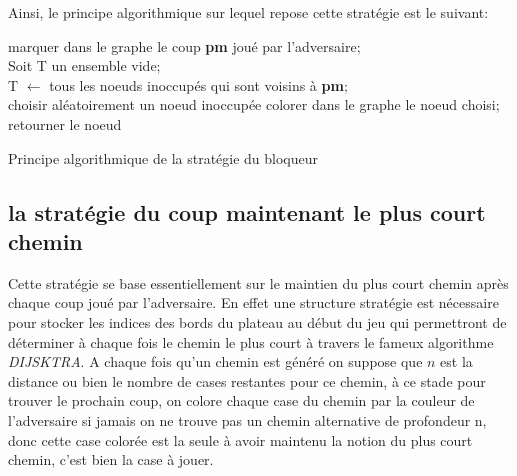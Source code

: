 Ainsi, le principe algorithmique sur lequel repose cette stratégie est le suivant:
\begin{algorithm}[H]

marquer dans le graphe le coup \textbf{pm} joué par l'adversaire;\\   
Soit T un ensemble vide;\\
T $\leftarrow$ tous les noeuds inoccupés qui sont voisins à \textbf{pm};\\
    {
    choisir aléatoirement un noeud inoccupée}
colorer dans le graphe le noeud choisi;\\
retourner le noeud

\caption{Principe algorithmique de la stratégie du bloqueur}
\label{algoBi}
\end{algorithm}

\subsection{la stratégie du coup maintenant le plus court chemin}
Cette stratégie se base essentiellement sur le maintien du plus court chemin après chaque coup joué par l'adversaire. En effet une structure stratégie est nécessaire pour stocker les indices des bords du plateau au début du jeu qui permettront de déterminer à chaque fois le chemin le plus court à travers le fameux algorithme \textit{DIJSKTRA}. A chaque fois qu'un chemin est généré on suppose que $n$ est la distance ou bien le nombre de cases restantes pour ce chemin, à ce stade pour trouver le prochain coup, on colore chaque case du chemin par la couleur de l'adversaire si jamais on ne trouve pas un chemin alternative de profondeur n, donc cette case colorée est la seule à avoir maintenu la notion du plus court chemin, c'est bien la case à jouer.

